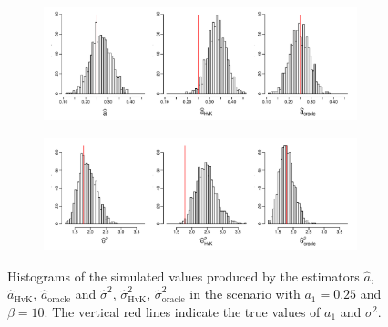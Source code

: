 \begin{figure}[t!]
\centering
\begin{subfigure}[b]{\textwidth}
\includegraphics[width=\textwidth]{Plots/a_hat_histograms_a1=25_T=500_slope=10_(q,K1,K2,M1,M2)=(25,2,10,20,30).pdf}
\end{subfigure}
\begin{subfigure}[b]{\textwidth}
\includegraphics[width=\textwidth]{Plots/lrv_histograms_a1=25_T=500_slope=10_(q,K1,K2,M1,M2)=(25,2,10,20,30).pdf}
\end{subfigure}
\caption{Histograms of the simulated values produced by the estimators $\widehat{a}$, $\widehat{a}_{\text{HvK}}$, $\widehat{a}_{\text{oracle}}$ and $\widehat{\sigma}^2$, $\widehat{\sigma}^2_{\text{HvK}}$, $\widehat{\sigma}^2_{\text{oracle}}$ in the scenario with $a_1 = 0.25$ and $\beta = 10$. The vertical red lines indicate the true values of $a_1$ and $\sigma^2$.}\label{fig:hist_scenario2} 
\end{figure}


